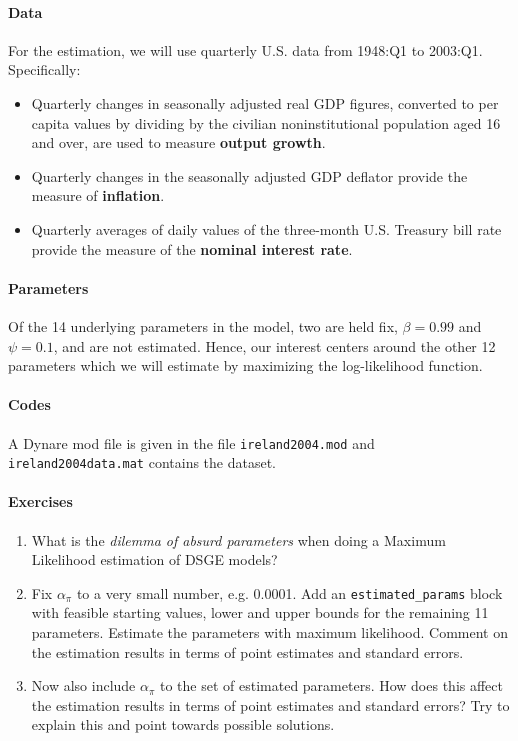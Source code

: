 \documentclass{article}
\begin{document}
\paragraph{Data}
For the estimation, we will use quarterly U.S. data from 1948:Q1 to 2003:Q1. Specifically:
\begin{itemize}
	\item Quarterly changes in seasonally adjusted real GDP figures, converted to per capita values by dividing by the civilian noninstitutional population aged 16 and over, are used to measure \textbf{output growth}.
	\item Quarterly changes in the seasonally adjusted GDP deflator provide the measure of \textbf{inflation}.
	\item Quarterly averages of daily values of the three-month U.S. Treasury bill rate provide the measure of the \textbf{nominal interest rate}.
\end{itemize}

\paragraph{Parameters}
Of the 14 underlying parameters in the model, two are held fix, $\beta=0.99$ and $\psi=0.1$, and are not estimated.
Hence, our interest centers around the other 12 parameters which we will estimate by maximizing the log-likelihood function.

\paragraph{Codes}
A Dynare mod file is given in the file \texttt{ireland2004.mod} and \texttt{ireland2004data.mat} contains the dataset.

\paragraph{Exercises}
\begin{enumerate}
	\item What is the \emph{dilemma of absurd parameters} when doing a Maximum Likelihood estimation of DSGE models?
	\item Fix $\alpha_\pi$ to a very small number, e.g. 0.0001.
	Add an \texttt{estimated\_params} block with feasible starting values, lower and upper bounds for the remaining 11 parameters.
	Estimate the parameters with maximum likelihood.
	Comment on the estimation results in terms of point estimates and standard errors.
	\item Now also include $\alpha_\pi$ to the set of estimated parameters.
	How does this affect the estimation results in terms of point estimates and standard errors?
	Try to explain this and point towards possible solutions.
\end{enumerate}
\end{document}

